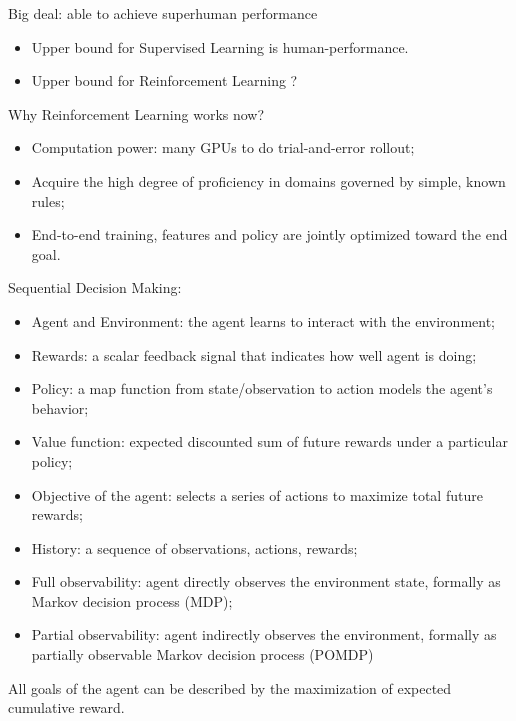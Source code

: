\documentclass{progartcn}
\begin{document}
	Big deal: able to achieve superhuman performance
	\begin{itemize}[noitemsep,topsep=0pt]
		\item Upper bound for Supervised Learning is human-performance. 
		\item Upper bound for Reinforcement Learning ?\\
	\end{itemize}

	Why Reinforcement Learning works now?
	\begin{itemize}[noitemsep,topsep=0pt]
		\item Computation power: many GPUs to do trial-and-error rollout;
		\item Acquire the high degree of proficiency in domains governed by simple, known rules;
		\item End-to-end training, features and policy are jointly optimized toward the end goal.\\
	\end{itemize}

	Sequential Decision Making:
	\begin{itemize}[noitemsep,topsep=0pt]
		\item Agent and Environment: the agent learns to interact with the environment;
		\item Rewards: a scalar feedback signal that indicates how well agent is doing;
		\item Policy: a map function from state/observation to action models the agent’s behavior;
		\item Value function: expected discounted sum of future rewards under a particular policy;
		\item Objective of the agent: selects a series of actions to maximize total future rewards;
		\item History: a sequence of observations, actions, rewards;
		\item Full observability: agent directly observes the environment state, formally as Markov decision process (MDP);
		\item Partial observability: agent indirectly observes the environment, formally as partially observable Markov decision process (POMDP)
	\end{itemize}

	All goals of the agent can be described by the maximization of expected cumulative reward.\\
\end{document}
